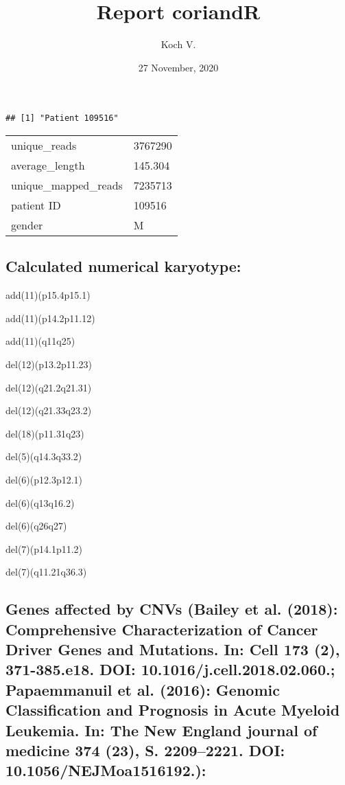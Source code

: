 \documentclass[]{article}
\title{Report coriandR}
\author{Koch V.}
\date{27 November, 2020}
\begin{document}
\maketitle

\begin{verbatim}
## [1] "Patient 109516"
\end{verbatim}

\begin{longtable}[]{@{}ll@{}}
\toprule
\endhead
unique\_reads & 3767290\tabularnewline
average\_length & 145.304\tabularnewline
unique\_mapped\_reads & 7235713\tabularnewline
patient ID & 109516\tabularnewline
gender & M\tabularnewline
\bottomrule
\end{longtable}

\hypertarget{calculated-numerical-karyotype}{%
\subsection{Calculated numerical
karyotype:}\label{calculated-numerical-karyotype}}

add(11)(p15.4p15.1)

add(11)(p14.2p11.12)

add(11)(q11q25)

del(12)(p13.2p11.23)

del(12)(q21.2q21.31)

del(12)(q21.33q23.2)

del(18)(p11.31q23)

del(5)(q14.3q33.2)

del(6)(p12.3p12.1)

del(6)(q13q16.2)

del(6)(q26q27)

del(7)(p14.1p11.2)

del(7)(q11.21q36.3)

\hypertarget{genes-affected-by-cnvs-bailey-et-al.-2018-comprehensive-characterization-of-cancer-driver-genes-and-mutations.-in-cell-173-2-371-385.e18.-doi-10.1016j.cell.2018.02.060.-papaemmanuil-et-al.-2016-genomic-classification-and-prognosis-in-acute-myeloid-leukemia.-in-the-new-england-journal-of-medicine-374-23-s.-22092221.-doi-10.1056nejmoa1516192.}{%
\subsection{Genes affected by CNVs (Bailey et al. (2018): Comprehensive
Characterization of Cancer Driver Genes and Mutations. In: Cell 173 (2),
371-385.e18. DOI: 10.1016/j.cell.2018.02.060.; Papaemmanuil et al.
(2016): Genomic Classification and Prognosis in Acute Myeloid Leukemia.
In: The New England journal of medicine 374 (23), S. 2209--2221. DOI:
10.1056/NEJMoa1516192.):}\label{genes-affected-by-cnvs-bailey-et-al.-2018-comprehensive-characterization-of-cancer-driver-genes-and-mutations.-in-cell-173-2-371-385.e18.-doi-10.1016j.cell.2018.02.060.-papaemmanuil-et-al.-2016-genomic-classification-and-prognosis-in-acute-myeloid-leukemia.-in-the-new-england-journal-of-medicine-374-23-s.-22092221.-doi-10.1056nejmoa1516192.}}
\end{document}
